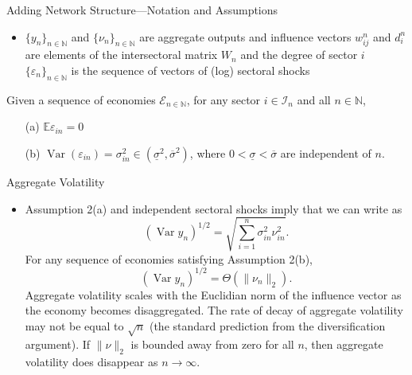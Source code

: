 \documentclass[dvipsnames]{beamer}
\newcommand{\var}{\operatorname{Var}}
\begin{document}
%
\begin{frame}{Adding Network Structure---Notation and Assumptions}
  \begin{itemize}
  \item $\{y_n\}_{n \in \mathbb{N}}$ and $\{\nu_n\}_{n \in \mathbb{N}}$ are aggregate outputs and influence vectors
    \vitem $w_{ij}^n$ and $d_i^n$ are elements of the intersectoral matrix $W_n$ and the degree of sector $i$
    \vitem $\{\varepsilon_n\}_{n \in \mathbb{N}}$ is the sequence of vectors of (log) sectoral shocks
  \end{itemize}
  \begin{assumption}[Assumption 2]
    Given a sequence of economies $\mathcal{E}_{n \in \mathbb{N}}$, for any sector $i \in \mathcal{I}_n$ and all $n \in \mathbb{N}$,
    \begin{enumerate}
    \item[(a)] $\mathbb{E} \varepsilon_{in} = 0$
      \item[(b)] $\var (\varepsilon_{in}) = \sigma^2_{in} \in (\underline{\sigma}^2, \overline{\sigma}^2)$, where $0 < \underline{\sigma} < \overline{\sigma}$ are independent of $n$.
    \end{enumerate}
  \end{assumption}
\end{frame}
%
\begin{frame}{Aggregate Volatility}
  \begin{itemize}
  \item Assumption 2(a) and independent sectoral shocks imply that we can write  as
    \[
      (\var y_n)^{1/2} = \sqrt{\sum^n_{i  = 1} \sigma^2_{in} \nu^2_{in}}.
    \]
    \vitem For any sequence of economies satisfying Assumption 2(b),
    \[
(\var y_n)^{1/2} = \Theta (\| \nu_n \|_2).
    \]
    \vitem Aggregate volatility scales with the Euclidian norm of the influence vector as the economy becomes disaggregated.
    \vitem The rate of decay of aggregate volatility may not be equal to $\sqrt{n}$ (the standard prediction from the diversification argument).
    \vitem If $\|\nu\|_2$ is bounded away from zero for all $n$, then aggregate volatility does  disappear as $n \to \infty$.
  \end{itemize}
\end{frame}
%
\end{document}
